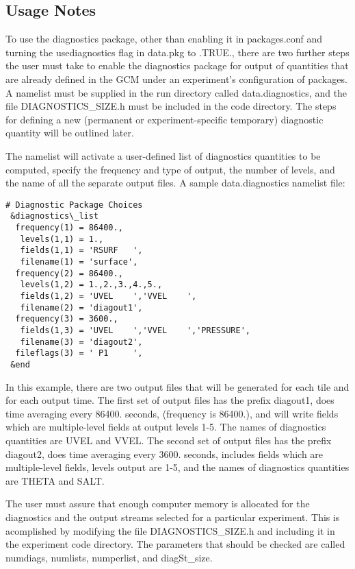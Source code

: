\subsection{Usage Notes}
\label{sec:diagnostics:usersguide}

\noindent
To use the diagnostics package, other than enabling it in packages.conf
and turning the usediagnostics flag in data.pkg to .TRUE., there are two
further steps the user must take to enable the diagnostics package for
output of quantities that are already defined in the GCM under an experiment's
configuration of packages.  A namelist must be supplied in the run directory 
called data.diagnostics, and the file DIAGNOSTICS\_SIZE.h must be included in the 
code directory.  The steps for defining a new (permanent or experiment-specific 
temporary) diagnostic quantity will be outlined later. 

\noindent The namelist will activate a user-defined list of diagnostics quantities 
to be computed, specify the frequency and type of output, the number of levels, and 
the name of all the separate output files. A sample data.diagnostics namelist file:

\begin{verbatim}
# Diagnostic Package Choices
 &diagnostics\_list
  frequency(1) = 86400., 
   levels(1,1) = 1., 
   fields(1,1) = 'RSURF   ', 
   filename(1) = 'surface', 
  frequency(2) = 86400., 
   levels(1,2) = 1.,2.,3.,4.,5., 
   fields(1,2) = 'UVEL    ','VVEL    ', 
   filename(2) = 'diagout1', 
  frequency(3) = 3600., 
   fields(1,3) = 'UVEL    ','VVEL    ','PRESSURE', 
   filename(3) = 'diagout2', 
  fileflags(3) = ' P1     ', 
 &end 
\end{verbatim}

\noindent
In this example, there are two output files that will be generated for
each tile and for each output time. The first set of output files has
the prefix diagout1, does time averaging every 86400. seconds,
(frequency is 86400.), and will write fields which are multiple-level
fields at output levels 1-5. The names of diagnostics quantities are
UVEL and VVEL.  The second set of output files has the prefix
diagout2, does time averaging every 3600. seconds, includes fields
which are multiple-level fields, levels output are 1-5, and the names
of diagnostics quantities are THETA and SALT.

\noindent
The user must assure that enough computer memory is allocated for the
diagnostics and the output streams selected for a particular
experiment.  This is acomplished by modifying the file
DIAGNOSTICS\_SIZE.h and including it in the experiment code directory.
The parameters that should be checked are called numdiags, numlists,
numperlist, and diagSt\_size.

